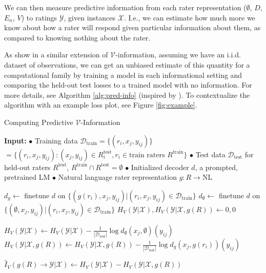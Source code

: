 \documentclass[11pt]{article}
\begin{document}
We can then measure predictive information from each rater representation ($\emptyset$, $D$, $E_n$, $V$) to ratings $\mathcal{Y}$, given instances $\mathcal{X}$. I.e., we can estimate how much more we know about how a rater will respond given particular information about them, as compared to knowing nothing about the rater.

As \citet{ethayarajh2022understandingdatasetdifficultymathcalvusable} show in a similar extension of $\mathcal{V}$-information, assuming we have an i.i.d. dataset of observations, we can get an unbiased estimate of this quantity for a computational family by training a model in each informational setting and comparing the held-out test losses to a trained model with no information. For more details, see Algorithm \ref{alg:pred-info} (inspired by \citealt{ethayarajh2022understandingdatasetdifficultymathcalvusable}).
To contextualize the algorithm with an example loss plot, see Figure \ref{fig:example}.

\begin{algorithm}[H]
\begin{algorithmic}[0]
\caption{Computing Predictive $\mathcal{V}$-Information}
\small
\label{alg:pred-info}
\State \textbf{Input:}
\State $\bullet$ Training data $\mathcal{D}_\text{train} = \{(r_i, x_j, y_{ij})\}$
$= \{(r_i,x_j,y_{ij}): (x_j,y_{ij}) \in R_i^\text{test}, r_i \in \text{train raters } R^\text{train}\}$
\State $\bullet$ Test data $\mathcal{D}_\text{test}$ for held-out raters $R^\text{test}$, $R^\text{train} \cap R^\text{test} = \emptyset$
\State $\bullet$ Initialized decoder $d$, a prompted, pretrained LM
\State $\bullet$ Natural language rater representation $g: R \to \text{NL}$

\medskip
\State $d_g \gets$ finetune $d$ on $\{(g(r_i), x_j, y_{ij}) | (r_i,x_j,y_{ij}) \in \mathcal{D}_\text{train}\}$
\State $d_\emptyset \gets$ finetune $d$ on $\{(\emptyset, x_j, y_{ij}) | (r_i,x_j,y_{ij}) \in \mathcal{D}_\text{train}\}$
\State $H_V(\mathcal{Y}|\mathcal{X}), H_V(\mathcal{Y}|\mathcal{X},g(R)) \gets 0, 0$

\State $H_V(\mathcal{Y}|\mathcal{X}) \gets H_V(\mathcal{Y}|\mathcal{X}) - \frac{1}{|\mathcal{D}_\text{test}|} \log d_\emptyset(x_j, \emptyset)(y_{ij})$
\State $H_V(\mathcal{Y}|\mathcal{X},g(R)) \gets H_V(\mathcal{Y}|\mathcal{X},g(R)) - \frac{1}{|\mathcal{D}_\text{test}|} \log d_g(x_j, g(r_i))(y_{ij})$
\EndFor

\State $\hat{I}_V(g(R) \to \mathcal{Y}|\mathcal{X}) \gets H_V(\mathcal{Y}|\mathcal{X}) - H_V(\mathcal{Y}|\mathcal{X},g(R))$
\end{algorithmic}
\end{algorithm}
\vspace{-10pt}
\end{document}
